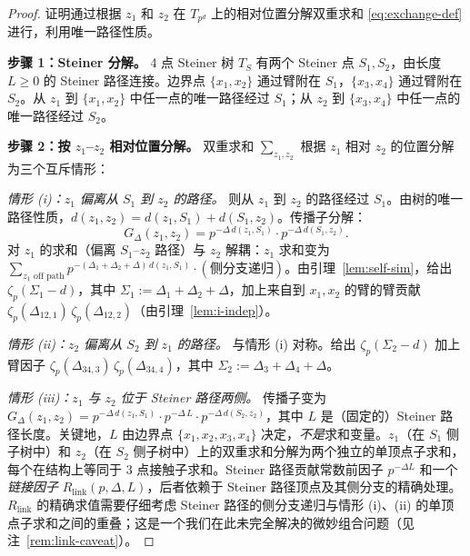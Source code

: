 \documentclass[11pt,a4paper]{ctexart}
\theoremstyle{remark}
\begin{document}
\begin{proof}
证明通过根据 $z_1$ 和 $z_2$ 在 $T_{p^d}$ 上的相对位置分解双重求和 \eqref{eq:exchange-def} 进行，利用唯一路径性质。

\textbf{步骤 1：Steiner 分解。} 4 点 Steiner 树 $T_S$ 有两个 Steiner 点 $S_1, S_2$，由长度 $L \geq 0$ 的 Steiner 路径连接。边界点 $\{x_1, x_2\}$ 通过臂附在 $S_1$，$\{x_3, x_4\}$ 通过臂附在 $S_2$。从 $z_1$ 到 $\{x_1, x_2\}$ 中任一点的唯一路径经过 $S_1$；从 $z_2$ 到 $\{x_3, x_4\}$ 中任一点的唯一路径经过 $S_2$。

\textbf{步骤 2：按 $z_1$--$z_2$ 相对位置分解。} 双重求和 $\sum_{z_1, z_2}$ 根据 $z_1$ 相对 $z_2$ 的位置分解为三个互斥情形：

\emph{情形 (i)：$z_1$ 偏离从 $S_1$ 到 $z_2$ 的路径。} 则从 $z_1$ 到 $z_2$ 的路径经过 $S_1$。由树的唯一路径性质，$d(z_1, z_2) = d(z_1, S_1) + d(S_1, z_2)$。传播子分解：
\begin{equation}
G_\Delta(z_1, z_2) = p^{-\Delta\,d(z_1, S_1)} \cdot p^{-\Delta\,d(S_1, z_2)}.
\end{equation}
对 $z_1$ 的求和（偏离 $S_1$--$z_2$ 路径）与 $z_2$ 解耦：$z_1$ 求和变为 $\sum_{z_1 \text{ off path}} p^{-(\Delta_1+\Delta_2+\Delta)\,d(z_1, S_1)} \cdot (\text{侧分支递归})$。由引理~\ref{lem:self-sim}，给出 $\zeta_p(\Sigma_1 - d)$，其中 $\Sigma_1 := \Delta_1 + \Delta_2 + \Delta$，加上来自到 $x_1, x_2$ 的臂的臂贡献 $\zeta_p(\Delta_{12,1})\,\zeta_p(\Delta_{12,2})$（由引理~\ref{lem:i-indep}）。

\emph{情形 (ii)：$z_2$ 偏离从 $S_2$ 到 $z_1$ 的路径。} 与情形 (i) 对称。给出 $\zeta_p(\Sigma_2 - d)$ 加上臂因子 $\zeta_p(\Delta_{34,3})\,\zeta_p(\Delta_{34,4})$，其中 $\Sigma_2 := \Delta_3 + \Delta_4 + \Delta$。

\emph{情形 (iii)：$z_1$ 与 $z_2$ 位于 Steiner 路径两侧。} 传播子变为 $G_\Delta(z_1, z_2) = p^{-\Delta\,d(z_1, S_1)} \cdot p^{-\Delta\,L} \cdot p^{-\Delta\,d(S_2, z_2)}$，其中 $L$ 是（固定的）Steiner 路径长度。关键地，$L$ 由边界点 $\{x_1, x_2, x_3, x_4\}$ 决定，\emph{不是}求和变量。$z_1$（在 $S_1$ 侧子树中）和 $z_2$（在 $S_2$ 侧子树中）上的双重求和分解为两个独立的单顶点子求和，每个在结构上等同于 3 点接触子求和。Steiner 路径贡献常数前因子 $p^{-\Delta L}$ 和一个\emph{链接因子} $R_{\mathrm{link}}(p, \Delta, L)$，后者依赖于 Steiner 路径顶点及其侧分支的精确处理。$R_{\mathrm{link}}$ 的精确求值需要仔细考虑 Steiner 路径的侧分支递归与情形 (i)、(ii) 的单顶点子求和之间的重叠；这是一个我们在此未完全解决的微妙组合问题（见注~\ref{rem:link-caveat}）。


\end{proof}
\end{document}
